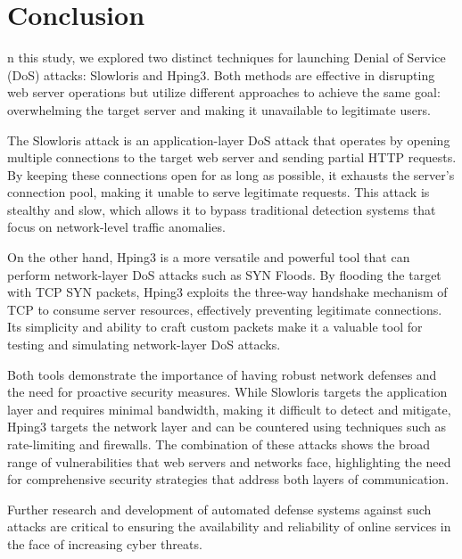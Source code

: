 \documentclass[conference]{IEEEtran}
\begin{document}
\section{Conclusion}
n this study, we explored two distinct techniques for launching Denial of Service (DoS) attacks: Slowloris and Hping3. Both methods are effective in disrupting web server operations but utilize different approaches to achieve the same goal: overwhelming the target server and making it unavailable to legitimate users.

The Slowloris attack is an application-layer DoS attack that operates by opening multiple connections to the target web server and sending partial HTTP requests. By keeping these connections open for as long as possible, it exhausts the server’s connection pool, making it unable to serve legitimate requests. This attack is stealthy and slow, which allows it to bypass traditional detection systems that focus on network-level traffic anomalies.

On the other hand, Hping3 is a more versatile and powerful tool that can perform network-layer DoS attacks such as SYN Floods. By flooding the target with TCP SYN packets, Hping3 exploits the three-way handshake mechanism of TCP to consume server resources, effectively preventing legitimate connections. Its simplicity and ability to craft custom packets make it a valuable tool for testing and simulating network-layer DoS attacks.

Both tools demonstrate the importance of having robust network defenses and the need for proactive security measures. While Slowloris targets the application layer and requires minimal bandwidth, making it difficult to detect and mitigate, Hping3 targets the network layer and can be countered using techniques such as rate-limiting and firewalls. The combination of these attacks shows the broad range of vulnerabilities that web servers and networks face, highlighting the need for comprehensive security strategies that address both layers of communication.

Further research and development of automated defense systems against such attacks are critical to ensuring the availability and reliability of online services in the face of increasing cyber threats.
\end{document}
